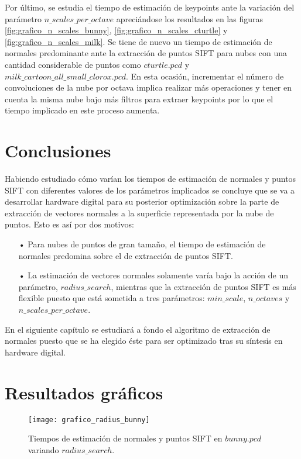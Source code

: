 Por último, se estudia el tiempo de estimación de keypoints ante la variación del parámetro $n\_scales\_per\_octave$ apreciándose los resultados en las figuras \ref{fig:grafico_n_scales_bunny}, \ref{fig:grafico_n_scales_cturtle} y \ref{fig:grafico_n_scales_milk}. Se tiene de nuevo un tiempo de estimación de normales predominante ante la extracción de puntos SIFT para nubes con una cantidad considerable de puntos como $cturtle.pcd$ y $milk\_cartoon\_all\_small\_clorox.pcd$. En esta ocasión, incrementar el número de convoluciones de la nube por octava implica realizar más operaciones y tener en cuenta la misma nube bajo más filtros para extraer keypoints por lo que el tiempo implicado en este proceso aumenta.


\section{Conclusiones}
Habiendo estudiado cómo varían los tiempos de estimación de normales y puntos SIFT con diferentes valores de los parámetros implicados se concluye que se va a desarrollar hardware digital para su posterior optimización sobre la parte de extracción de vectores normales a la superficie representada por la nube de puntos. Esto es así por dos motivos:

\begin{itemize}
\item[•]Para nubes de puntos de gran tamaño, el tiempo de estimación de normales predomina sobre el de extracción de puntos SIFT.
\item[•]La estimación de vectores normales solamente varía bajo la acción de un parámetro, $radius\_search$, mientras que la extracción de puntos SIFT es más flexible puesto que está sometida a tres parámetros: $min\_scale$, $n\_octaves$ y $n\_scales\_per\_octave$.
\end{itemize}

En el siguiente capítulo se estudiará a fondo el algoritmo de extracción de normales puesto que se ha elegido éste para ser optimizado tras su síntesis en hardware digital.

\section{Resultados gráficos}\label{resultados_graficos}

\begin{figure}[h!]
\centering
\texttt{[image: grafico\_radius\_bunny]}
\caption{Tiempos de estimación de normales y puntos SIFT en $bunny.pcd$ variando $radius\_search$.}\label{fig:grafico_radius_bunny}
\end{figure}


